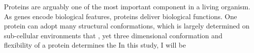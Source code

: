 Proteins are arguably one of the most important component in a living organism. As genes encode biological features, proteins deliver biological functions. One protein can adopt many structural conformations, which is largely determined on sub-cellular environments that , yet three dimensional conformation and flexibility of a protein determines the     In this study, I will be 